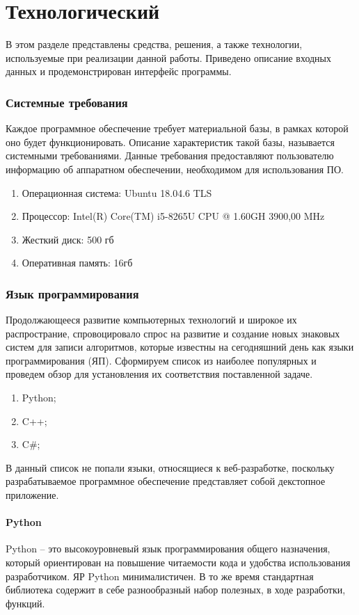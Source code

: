 \chapter{Технологический}
В этом разделе представлены средства, решения, а также технологии, используемые при реализации данной работы.
Приведено описание входных данных и продемонстрирован интерфейс программы.

\subsection{Системные требования}
Каждое программное обеспечение требует материальной базы, в рамках которой оно будет функционировать.
Описание характеристик такой базы, называется системными требованиями.
Данные требования предоставляют пользователю информацию об аппаратном обеспечении, необходимом для использования ПО.
\begin{enumerate}
	\item Операционная система: Ubuntu 18.04.6 TLS
	\item Процессор: Intel(R) Core(TM) i5-8265U CPU @ 1.60GH	3900,00 MHz	
	\item Жесткий диск: 500 гб
	\item Оперативная память: 16гб
\end{enumerate}

\subsection{Язык программирования}
Продолжающееся развитие компьютерных технологий и широкое их распространие, спровоцировало спрос на развитие и создание новых знаковых систем для записи алгоритмов, которые известны на сегодняшний день как языки программирования (ЯП).
Сформируем список из наиболее популярных и проведем обзор для установления их соответствия поставленной задаче.
\begin{enumerate}
	\item Python;
	\item C++;
	\item C\#;
\end{enumerate}

В данный список не попали языки, относящиеся к веб-разработке, поскольку разрабатываемое программное обеспечение представляет собой декстопное приложение.

\subsubsection{Python}
Python –  это высокоуровневый язык программирования общего назначения, который ориентирован на повышение читаемости кода и удобства использования разработчиком. 
ЯР Python минималистичен. 
В то же время стандартная библиотека содержит в себе разнообразный набор полезных, в ходе разработки, функций.

